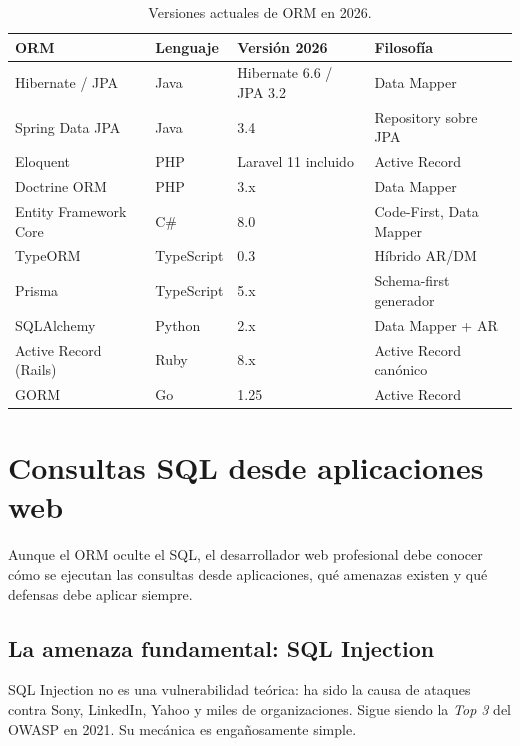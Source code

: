 \documentclass[11pt,a4paper,openany]{book}
\begin{document}
\begin{table}[htbp]
\centering
\caption{Versiones actuales de ORM en 2026.}
\footnotesize
\begin{tabular}{llll}
\toprule
\textbf{ORM} & \textbf{Lenguaje} & \textbf{Versión 2026} & \textbf{Filosofía}\\
\midrule
Hibernate / JPA      & Java       & Hibernate 6.6 / JPA 3.2 & Data Mapper\\
Spring Data JPA      & Java       & 3.4                     & Repository sobre JPA\\
Eloquent             & PHP        & Laravel 11 incluido     & Active Record\\
Doctrine ORM         & PHP        & 3.x                     & Data Mapper\\
Entity Framework Core & C\#       & 8.0                     & Code-First, Data Mapper\\
TypeORM              & TypeScript & 0.3                     & Híbrido AR/DM\\
Prisma               & TypeScript & 5.x                     & Schema-first generador\\
SQLAlchemy           & Python     & 2.x                     & Data Mapper + AR\\
Active Record (Rails) & Ruby      & 8.x                     & Active Record canónico\\
GORM                 & Go         & 1.25                    & Active Record\\
\bottomrule
\end{tabular}
\end{table}

\section{Consultas SQL desde aplicaciones web}

Aunque el ORM oculte el SQL, el desarrollador web profesional
debe conocer cómo se ejecutan las consultas desde aplicaciones,
qué amenazas existen y qué defensas debe aplicar siempre.


\subsection{La amenaza fundamental: SQL Injection}

SQL Injection no es una vulnerabilidad teórica: ha sido la
causa de ataques contra Sony, LinkedIn, Yahoo y miles de
organizaciones. Sigue siendo la \emph{Top 3} del OWASP en 2021. Su
mecánica es engañosamente simple.
\end{document}
